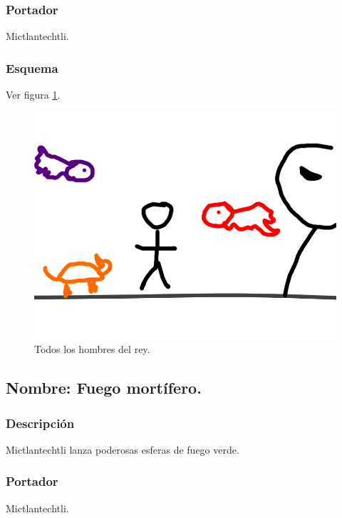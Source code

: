 \documentclass[11pt,letterpaper]{article}
\begin{document}
\subsubsection{Portador}
Mictlantechtli.
\subsubsection{Esquema}
			Ver figura \ref{fig:rey}.
			\begin{figure}
				\centering
				\includegraphics[height=0.2 \textheight]{Imagenes/rey}
				\caption{Todos los hombres del rey.}
				\label{fig:rey}
			\end{figure}
\subsection{Nombre: Fuego mortífero.}
\subsubsection{Descripción}
Mictlantechtli  lanza poderosas esferas de fuego verde.
\subsubsection{Portador}
Mictlantechtli.	
\end{document}
